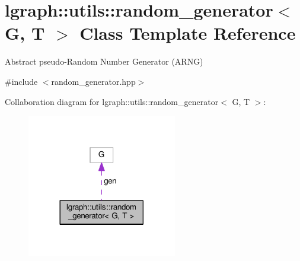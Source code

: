 \hypertarget{classlgraph_1_1utils_1_1random__generator}{}\section{lgraph\+:\+:utils\+:\+:random\+\_\+generator$<$ G, T $>$ Class Template Reference}
\label{classlgraph_1_1utils_1_1random__generator}


Abstract pseudo-\/\+Random Number Generator (A\+R\+NG)  




{\ttfamily \#include $<$random\+\_\+generator.\+hpp$>$}



Collaboration diagram for lgraph\+:\+:utils\+:\+:random\+\_\+generator$<$ G, T $>$\+:\nopagebreak
\begin{figure}[H]
\begin{center}
\leavevmode
\includegraphics[width=185pt]{classlgraph_1_1utils_1_1random__generator__coll__graph}
\end{center}
\end{figure}
